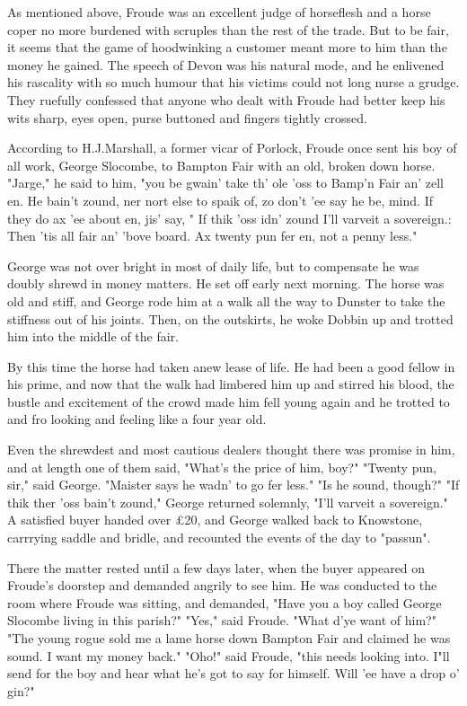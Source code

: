 As mentioned above, Froude was an excellent judge of horseflesh and a horse coper no more burdened with scruples than the rest of the trade. But to be fair, it seems that the game of hoodwinking a customer meant more to him than the money he gained. The speech of Devon was his natural mode, and he enlivened his rascality with so much humour that his victims could not long nurse a grudge. They ruefully confessed that anyone who dealt with Froude had better keep his wits sharp, eyes open, purse buttoned and fingers tightly crossed.

According to H.J.Marshall, a former vicar of Porlock, Froude once sent his boy of all work, George Slocombe, to Bampton Fair with an old, broken down horse. "Jarge," he said to him, "you be gwain' take th' ole 'oss to Bamp'n Fair an' zell en. He bain't zound, ner nort else to spaik of, zo don't 'ee say he be, mind. If they do ax 'ee about en, jis' say, " If thik 'oss idn' zound I'll varveit a sovereign.: Then 'tis all fair an' 'bove board. Ax twenty pun fer en, not a penny less."

George was not over bright in most of daily life, but to compensate he was doubly shrewd in money matters. He set off early next morning. The horse was old and stiff, and George rode him at a walk all the way to Dunster to take the stiffness out of his joints. Then, on the outskirts, he woke Dobbin up and trotted him into the middle of the fair.

By this time the horse had taken anew lease of life. He had been a good fellow in his prime, and now that the walk had limbered him up and stirred his blood, the bustle and excitement of the crowd made him fell young again and he trotted to and fro looking and feeling like a four year old.

Even the shrewdest and most cautious dealers thought there was promise in him, and at length one of them said, "What's the price of him, boy?"
 "Twenty pun, sir," said George. "Maister says he wadn' to go fer less."
 "Is he sound, though?"
 "If thik ther 'oss bain't zound," George returned solemnly, "I'll varveit a sovereign."
 A satisfied buyer handed over £20, and George walked back to Knowstone, carrrying saddle and bridle, and recounted the events of the day to "passun".

There the matter rested until a few days later, when the buyer appeared on Froude's doorstep and demanded angrily to see him. He was conducted to the room where Froude was sitting, and demanded, "Have you a boy called George Slocombe living in this parish?"
 "Yes," said Froude. "What d'ye want of him?"
 "The young rogue sold me a lame horse down Bampton Fair and claimed he was sound. I want my money back."
 "Oho!" said Froude, "this needs looking into. I"ll send for the boy and hear what he's got to say for himself. Will 'ee have a drop o' gin?"

